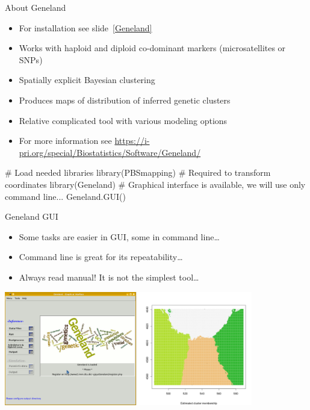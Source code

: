 \documentclass[compress, ucs, xelatex, 11pt, xcolor=svgnames, aspectratio=169,
	hyperref={
		bookmarks=true,
		unicode=true,
		colorlinks=true,
		pdftitle={Molecular data in R},
		plainpages=false,
		pdfauthor={Vojtech Zeisek},
		pdfsubject={Course about phylogeny and evolution in R},
		pdfcreator={XeLaTeX},
		pdfkeywords={R, evolution, phylogeny, molecular data},
		linkcolor=Crimson, %
		anchorcolor=Magenta, %
		citecolor=Magenta, %
		filecolor=Magenta, %
		menucolor=Magenta, %
		urlcolor=DodgerBlue, %
		pdftex},
	url={hyphens, lowtilde} %
	]{beamer}
\begin{document}
\begin{frame}[fragile]{About Geneland}
	\label{GenelandUse}
	\begin{itemize}
		\item For installation see slide~\ref{Geneland}
		\item Works with haploid and diploid co-dominant markers (microsatellites or SNPs)
		\item Spatially explicit Bayesian clustering
		\item Produces maps of distribution of inferred genetic clusters
		\item Relative complicated tool with various modeling options
		\item For more information see \url{https://i-pri.org/special/Biostatistics/Software/Geneland/}
	\end{itemize}
	\vfill
	\begin{spluscode}
    # Load needed libraries
    library(PBSmapping) # Required to transform coordinates
    library(Geneland)
    # Graphical interface is available, we will use only command line...
    Geneland.GUI()
	\end{spluscode}
\end{frame}

\begin{frame}{Geneland GUI}
	\begin{itemize}
		\item Some tasks are easier in GUI, some in command line\ldots
		\item Command line is great for its repeatability\ldots
		\item Always read manual! It is not the simplest tool\ldots
	\end{itemize}
	\begin{center}
		\includegraphics[height=5cm]{geneland_gui.png}
	\end{center}
\end{frame}
\end{document}
